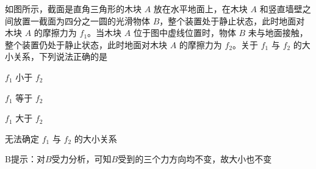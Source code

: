 如图所示，截面是直角三角形的木块 \(A\) 放在水平地面上，在木块 \(A\) 和竖直墙壁之间放置一截面为四分之一圆的光滑物体 \(B\)，整个装置处于静止状态，此时地面对木块 \(A\) 的摩擦力为 \(f_1\)。当木块 \(A\) 位于图中虚线位置时，物体 \(B\)  未与地面接触，整个装置仍处于静止状态，此时地面对木块 \(A\) 的摩擦力为 \(f_2\)。关于 \(f_1\) 与 \(f_2\) 的大小关系，下列说法正确的是\paren[]
	
\begin{choices}
	\item \(f_1\) 小于 \(f_2\)
	\item \(f_1\) 等于 \(f_2\)
	\item \(f_1\) 大于 \(f_2\)
	\item 无法确定 \(f_1\) 与 \(f_2\) 的大小关系
\end{choices}
\begin{answer}
    B\qquad 提示：对\(B\)受力分析，可知\(B\)受到的三个力方向均不变，故大小也不变
\end{answer}